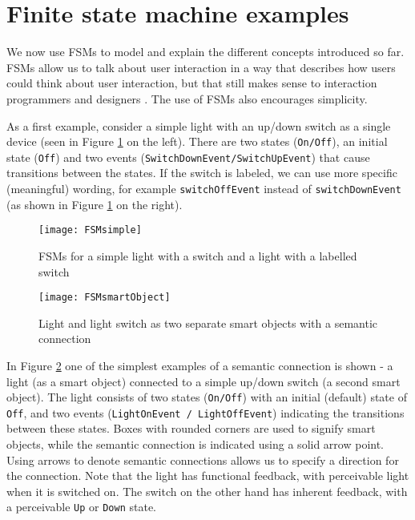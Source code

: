



\section{Finite state machine examples}
\label{fsmexample}
We now use \acp{FSM} to model and explain the different concepts introduced so far. \acp{FSM} allow us to talk about user interaction in a way that describes how users could think about user interaction, but that still makes sense to interaction programmers and designers \cite{Thimbleby2007}. The use of \acp{FSM} also encourages simplicity. 

As a first example, consider a simple light with an up/down switch as a single device (seen in Figure \ref{FSMsimple} on the left). There are two states (\texttt{On/Off}), an initial state (\texttt{Off}) and two events (\texttt{Switch\-Down\-Event/Switch\-Up\-Event}) that cause transitions be\-tween the states. If the switch is labeled, we can use more specific (meaningful) wording, for example \texttt{switch\-Off\-Event} instead of \texttt{switchDownEvent} (as shown in Figure \ref{FSMsimple} on the right). %

\begin{figure}
\centerline{\texttt{[image: FSMsimple]}}
\caption{FSMs for a simple light with a switch and a light with a labelled switch}
\label{FSMsimple}
\end{figure}

\begin{figure}
\centerline{\texttt{[image: FSMsmartObject]}}
\caption{Light and light switch as two separate smart objects with a semantic connection}
\label{FSMsmartObject}
\end{figure}

In Figure \ref{FSMsmartObject} one of the simplest examples of a semantic connection is shown - a light (as a smart object) connected to a simple up/down switch (a second smart object). The light consists of two states (\texttt{On/Off}) with an initial (default) state of \texttt{Off}, and two events (\texttt{Light\-On\-Event / Light\-Off\-Event}) indicating the transitions between these states. Boxes with rounded corners are used to signify smart objects, while the semantic connection is indicated using a solid arrow point. Using arrows to denote semantic connections allows us to specify a direction for the connection.  Note that the light has functional feedback, with perceivable light when it is switched on. The switch on the other hand has inherent feedback, with a perceivable \texttt{Up} or \texttt{Down} state.  

